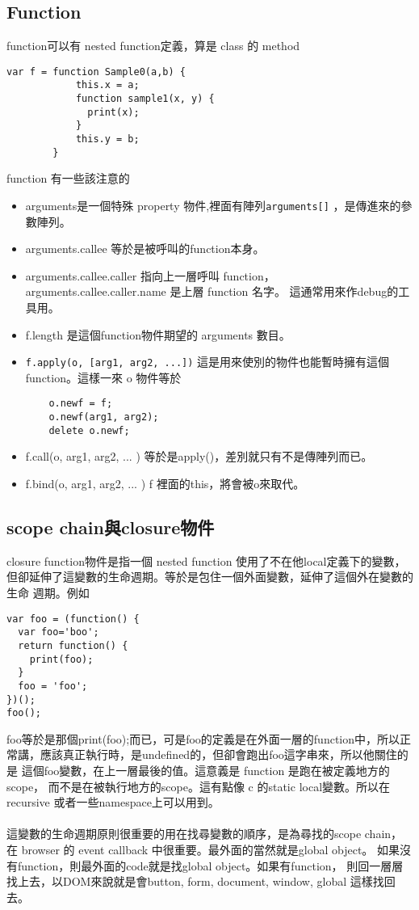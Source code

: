 \subsection{Function}
function可以有 nested function定義，算是 class 的 method
\begin{verbatim}
var f = function Sample0(a,b) {
            this.x = a;
            function sample1(x, y) {
              print(x);
            }
            this.y = b;
        }
\end{verbatim}
function 有一些該注意的
\begin{itemize}
  \item arguments是一個特殊 property 物件,裡面有陣列\verb=arguments[]=
    ，是傳進來的參數陣列。
  \item arguments.callee 等於是被呼叫的function本身。
  \item arguments.callee.caller 指向上一層呼叫 function，
    arguments.callee.caller.name 是上層 function 名字。
    這通常用來作debug的工具用。
  \item f.length 是這個function物件期望的 arguments 數目。
  \item \verb=f.apply(o, [arg1, arg2, ...])= 這是用來使別的物件也能暫時擁有這個
    function。這樣一來 o 物件等於
    \begin{verbatim}
    o.newf = f;
    o.newf(arg1, arg2);
    delete o.newf;
    \end{verbatim}
  \item f.call(o, arg1, arg2, ... ) 等於是apply()，差別就只有不是傳陣列而已。
  \item f.bind(o, arg1, arg2, ... ) f 裡面的this，將會被o來取代。
\end{itemize}

\subsection{scope chain與closure物件}
closure function物件是指一個 nested function 使用了不在他local定義下的變數，
但卻延伸了這變數的生命週期。等於是包住一個外面變數，延伸了這個外在變數的生命
週期。例如
\begin{verbatim}
var foo = (function() {
  var foo='boo';
  return function() {
    print(foo);
  }
  foo = 'foo';
})();
foo();
\end{verbatim}
foo等於是那個print(foo);而已，可是foo的定義是在外面一層的function中，所以正
常講，應該真正執行時，是undefined的，但卻會跑出foo這字串來，所以他關住的是
這個foo變數，在上一層最後的值。這意義是 function 是跑在被定義地方的scope，
而不是在被執行地方的scope。這有點像 c 的static local變數。所以在recursive
或者一些namespace上可以用到。
\\\\
這變數的生命週期原則很重要的用在找尋變數的順序，是為尋找的scope chain，
在 browser 的 event callback 中很重要。最外面的當然就是global object。
如果沒有function，則最外面的code就是找global object。如果有function，
則回一層層找上去，以DOM來說就是會button, form, document, window, global
這樣找回去。

